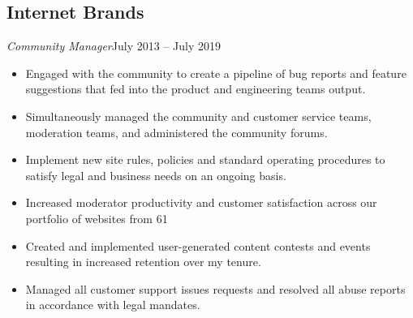 \documentclass[10.5pt, oneside]{memoir}
\newcommand{\employer}[2]{
    \subsection{#1\hfill\normalsize\mdseries{#2}}}
\newcommand{\position}[2]{
    \textit{#1}\hfill{#2}}
\begin{document}
\employer{Internet Brands }{Remote}
\position{Community Manager}{July 2013 -- July 2019}
\begin{itemize}
    \item Engaged with the community to create a pipeline of bug reports and
          feature suggestions that fed into the product and engineering teams
          output.
    \item Simultaneously managed the community and customer service teams,
          moderation teams, and administered the community forums.
    \item Implement new site rules, policies and standard operating procedures
          to satisfy legal and business needs on an ongoing basis.
    \item Increased moderator productivity and customer satisfaction
          across our portfolio of websites from
          61%
    \item Created and implemented user-generated content contests and
          events resulting in increased retention over my tenure.
    \item Managed all customer support issues requests and resolved all
          abuse reports in accordance with legal mandates.
\end{itemize}
\end{document}
